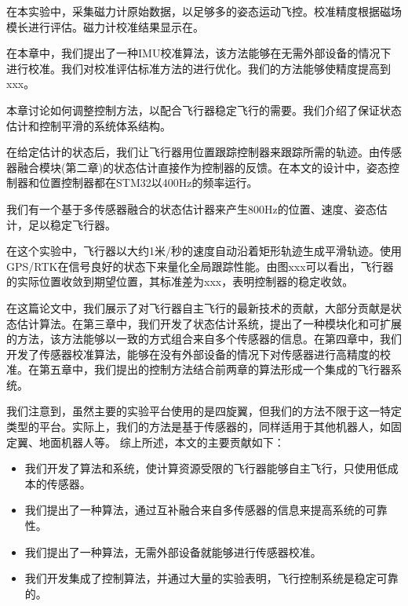 \documentclass[
  type=master
]{gdutthesis}
\begin{document}
在本实验中，采集磁力计原始数据，以足够多的姿态运动飞控。校准精度根据磁场模长进行评估。磁力计校准结果显示在。

在本章中，我们提出了一种IMU校准算法，该方法能够在无需外部设备的情况下进行校准。我们对校准评估标准方法的进行优化。我们的方法能够使精度提高到xxx。

本章讨论如何调整控制方法，以配合飞行器稳定飞行的需要。我们介绍了保证状态估计和控制平滑的系统体系结构。

在给定估计的状态后，我们让飞行器用位置跟踪控制器来跟踪所需的轨迹\cite{lee2010geometric}。由传感器融合模块(第二章)的状态估计直接作为控制器的反馈。在本文的设计中，姿态控制器和位置控制器都在STM32以400Hz的频率运行。

我们有一个基于多传感器融合的状态估计器来产生800Hz的位置、速度、姿态估计，足以稳定飞行器。

在这个实验中，飞行器以大约1米/秒的速度自动沿着矩形轨迹生成平滑轨迹。使用GPS/RTK在信号良好的状态下来量化全局跟踪性能。由图xxx可以看出，飞行器的实际位置收敛到期望位置，其标准差为xxx，表明控制器的稳定收敛。

\gdutbackmatter
{}
在这篇论文中，我们展示了对飞行器自主飞行的最新技术的贡献，大部分贡献是状态估计算法。在第三章中，我们开发了状态估计系统，提出了一种模块化和可扩展的方法，该方法能够以一致的方式组合来自多个传感器的信息。在第四章中，我们开发了传感器校准算法，能够在没有外部设备的情况下对传感器进行高精度的校准。在第五章中，我们提出的控制方法结合前两章的算法形成一个集成的飞行器系统。

我们注意到，虽然主要的实验平台使用的是四旋翼，但我们的方法不限于这一特定类型的平台。实际上，我们的方法是基于传感器的，同样适用于其他机器人，如固定翼、地面机器人等。
综上所述，本文的主要贡献如下：
\begin{itemize}
	\item 我们开发了算法和系统，使计算资源受限的飞行器能够自主飞行，只使用低成本的传感器。
	\item 我们提出了一种算法，通过互补融合来自多传感器的信息来提高系统的可靠性。
	\item 我们提出了一种算法，无需外部设备就能够进行传感器校准。
	\item 我们开发集成了控制算法，并通过大量的实验表明，飞行控制系统是稳定可靠的。
\end{itemize}
\end{document}
